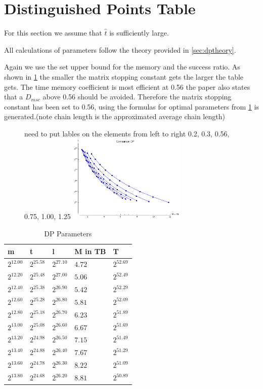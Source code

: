 \section{Distinguished Points Table}
For this section we assume that $\hat{t}$ is sufficiently large.

All calculations of parameters follow the theory provided in
\ref{sec:dptheory}.

Again we use the set upper bound for the memory and the success ratio.
As shown in \ref{fig:dpHmsc} the smaller the matrix stopping constant
gets the larger the table gets. The time memory coefficient is most
efficient at 0.56 \cite{176} the paper also states that a $D_{msc}$ above
0.56 should be avoided. Therefore the matrix stopping constant has been
set to 0.56, using the formulas for optimal parameters from \cite{176}
\ref{tab:DPparam} is generated.(note chain length is the approximated average chain length)
\begin{figure}[H]
  \centering
  need to put lables on the elements from left to right 0.2, 0.3, 0.56, 0.75, 1.00, 1.25
    \includegraphics[width=0.5\textwidth]{figures/compareDmsc.png}
    \label{fig:dpHmsc}
\end{figure}
\begin{table}[H]
  \centering
\begin{tabular}{lllll}
m & t & l & M in TB & T \\\hline
$2^{12.00}$ & $2^{25.58}$ & $2^{27.10}$ & $4.72$ & $2^{52.69}$ \\
$2^{12.20}$ & $2^{25.48}$ & $2^{27.00}$ & $5.06$ & $2^{52.49}$ \\
$2^{12.40}$ & $2^{25.38}$ & $2^{26.90}$ & $5.42$ & $2^{52.29}$ \\
$2^{12.60}$ & $2^{25.28}$ & $2^{26.80}$ & $5.81$ & $2^{52.09}$ \\
$2^{12.80}$ & $2^{25.18}$ & $2^{26.70}$ & $6.23$ & $2^{51.89}$ \\
$2^{13.00}$ & $2^{25.08}$ & $2^{26.60}$ & $6.67$ & $2^{51.69}$ \\
$2^{13.20}$ & $2^{24.98}$ & $2^{26.50}$ & $7.15$ & $2^{51.49}$ \\
$2^{13.40}$ & $2^{24.88}$ & $2^{26.40}$ & $7.67$ & $2^{51.29}$ \\
$2^{13.60}$ & $2^{24.78}$ & $2^{26.30}$ & $8.22$ & $2^{51.09}$ \\
$2^{13.80}$ & $2^{24.68}$ & $2^{26.20}$ & $8.81$ & $2^{50.89}$ \\
\end{tabular}
  \caption{DP Parameters}
  \label{tab:DPparam}
\end{table}
